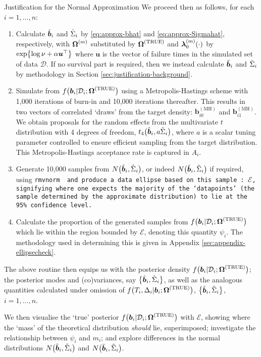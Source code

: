 \begin{chapter}{\label{cha:justification}Justification for the Normal Approximation}
  We proceed then as follows, for each $i=1,\dots,n$:
  \begin{enumerate}
      \item Calculate $\hat{\bm{b}}_i$ and $\hat{\Sigma}_i$ by \eqref{eq:approx-bhat} and \eqref{eq:approx-Sigmahat}, respectively, with $\bm{\mathrm{\Omega}}^{(m)}$ substituted by $\bm{\mathrm{\Omega}}^{(\mathrm{TRUE})}$ and $\bm{\lambda}_0^{(m)}\!\left(\cdot\right)$ by $\exp\!\left\{\log\nu+\alpha\bm{u}^\top\right\}$ where $\bm{u}$ is the vector of failure times in the simulated set of data $\mathcal{D}$. If no survival part is required, then we instead calculate $\tilde{\bm{b}}_i$ and $\tilde{\Sigma}_i$ by methodology in Section \ref{sec:justification-background}.
      \item Simulate from $f\big(\bm{b}_i|\mathcal{D}_i;\bm{\mathrm{\Omega}}^{(\mathrm{TRUE})}\big)$ using a Metropolis-Hastings scheme with 1,000 iterations of burn-in and 10,000 iterations thereafter. This results in two vectors of correlated `draws' from the target density: $\bm{b}_{i0}^{(\mathrm{MH})}$ and $\bm{b}_{i1}^{(\mathrm{MH})}$. We obtain proposals for the random effects from the multivariate $t$ distribution with 4 degrees of freedom, $t_4\big(\hat{\bm{b}}_i,a\hat{\Sigma}_i\big)$, where $a$ is a scalar tuning parameter controlled to ensure efficient sampling from the target distribution. This Metropolis-Hastings acceptance rate is captured in $A_i$.
      \item Generate 10,000 samples from $N\big(\hat{\bm{b}}_i,\hat{\Sigma}_i\big)$, or indeed $N\big(\tilde{\bm{b}}_i,\tilde{\Sigma}_i\big)$ if required, using \eg \tt{rmvnorm} \citep{R-mvtnorm} and produce a data ellipse based on this sample \citep{R-car, Friendly2013}: $\mathcal{E}$, signifying where one expects the majority of the `datapoints' (\ie the sample determined by the approximate distribution) to lie at the 95\% confidence level.
      \item Calculate the proportion of the generated samples from $f\big(\bm{b}_i|\mathcal{D}_i;\bm{\mathrm{\Omega}}^{(\mathrm{TRUE})}\big)$ which lie within the region bounded by $\mathcal{E}$, denoting this quantity $\psi_i$. The methodology used in determining this is given in Appendix \ref{sec:appendix-ellipsecheck}.
  \end{enumerate}
  The above routine then equips us with the posterior density $f\big(\bm{b}_i|\mathcal{D}_i;\bm{\mathrm{\Omega}}^{(\mathrm{TRUE})}\big)$; the posterior modes and (co)variances, say $\big\{\hat{\bm{b}}_i,\hat{\Sigma}_i\big\}$, as well as the analogous quantities calculated under omission of $f\big(T_i,\Delta_i|\bm{b}_i;\bm{\mathrm{\Omega}}^{(\mathrm{TRUE})}\big)$, $\big\{\tilde{\bm{b}}_i,\tilde{\Sigma}_i\big\}$, $i=1,\dots,n$.

  We then visualise the `true' posterior $f\big(\bm{b}_i|\mathcal{D}_i;\bm{\mathrm{\Omega}}^{(\mathrm{TRUE})}\big)$ with $\mathcal{E}$, showing where the `mass' of the theoretical distribution \textit{should} lie, superimposed; investigate the relationship between $\psi_i$ and $m_i$; and explore differences in the normal distributions $N\big(\hat{\bm{b}}_i,\hat{\Sigma}_i\big)$ and $N\big(\tilde{\bm{b}}_i,\tilde{\Sigma}_i\big)$.


\end{chapter}

